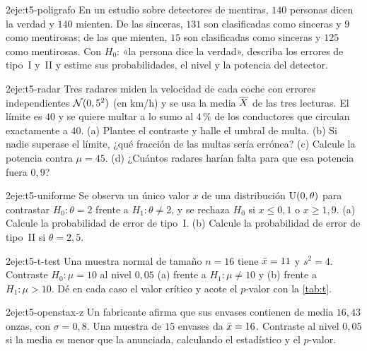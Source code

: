 \begin{ejercicio}{2}{eje:t5-poligrafo}
En un estudio sobre detectores de mentiras, $140$ personas dicen la verdad y $140$ mienten. De las sinceras, $131$ son clasificadas como sinceras y $9$ como mentirosas; de las que mienten, $15$ son clasificadas como sinceras y $125$ como mentirosas. Con $H_0$: «la persona dice la verdad», describa los errores de tipo~I y~II y estime sus probabilidades, el nivel y la potencia del detector.
\end{ejercicio}

\begin{ejercicio}{2}{eje:t5-radar}
Tres radares miden la velocidad de cada coche con errores independientes $\mathcal{N}(0,5^{2})$ (en km/h) y se usa la media $\overline{X}$ de las tres lecturas. El límite es $40$ y se quiere multar a lo sumo al $4\,\%$ de los conductores que circulan exactamente a $40$. (a) Plantee el contraste y halle el umbral de multa. (b) Si nadie superase el límite, ¿qué fracción de las multas sería errónea? (c) Calcule la potencia contra $\mu=45$. (d) ¿Cuántos radares harían falta para que esa potencia fuera $0{,}9$?
\end{ejercicio}

\begin{ejercicio}{2}{eje:t5-uniforme}
Se observa un único valor $x$ de una distribución $\operatorname{U}(0,\theta)$ para contrastar $H_0:\theta=2$ frente a $H_1:\theta\neq2$, y se rechaza $H_0$ si $x\le0{,}1$ o $x\ge1{,}9$. (a) Calcule la probabilidad de error de tipo~I. (b) Calcule la probabilidad de error de tipo~II si $\theta=2{,}5$.
\end{ejercicio}

\begin{ejercicio}{2}{eje:t5-t-test}
Una muestra normal de tamaño $n=16$ tiene $\bar{x}=11$ y $s^{2}=4$. Contraste $H_0:\mu=10$ al nivel $0{,}05$ (a) frente a $H_1:\mu\neq10$ y (b) frente a $H_1:\mu>10$. Dé en cada caso el valor crítico y acote el $p$-valor con la \cref{tab:t}.
\end{ejercicio}

\begin{ejercicio}{2}{eje:t5-openstax-z}
Un fabricante afirma que sus envases contienen de media $16{,}43$ onzas, con $\sigma=0{,}8$. Una muestra de $15$ envases da $\bar{x}=16$. Contraste al nivel $0{,}05$ si la media es menor que la anunciada, calculando el estadístico y el $p$-valor.
\end{ejercicio}

